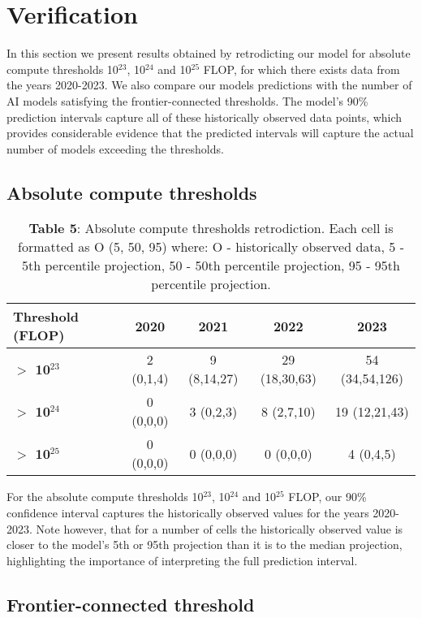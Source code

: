 \documentclass[11pt]{article}
\begin{document}
\section{Verification}

In this section we present results obtained by retrodicting our model for absolute compute thresholds 10$^{23}$, 10$^{24}$ and 10$^{25}$ FLOP, for which there exists data from the years 2020-2023. We also compare our models predictions with the number of AI models satisfying the frontier-connected thresholds. The model's 90\% prediction intervals capture all of these historically observed data points, which provides considerable evidence that the predicted intervals will capture the actual number of models exceeding the thresholds.

\subsection{Absolute compute thresholds}

\begin{table}[h]
\centering
\caption*{\textbf{Table 5}: Absolute compute thresholds retrodiction. Each cell is formatted as O (5, 50, 95) where: O - historically observed data, 5 - 5th percentile projection, 50 - 50th percentile projection, 95 - 95th percentile projection.}
\label{tab:absolute-retrodiction}
\begin{tabular}{|l|c|c|c|c|}
\hline
\textbf{Threshold (FLOP)} & \textbf{2020} & \textbf{2021} & \textbf{2022} & \textbf{2023} \\
\hline
\textbf{$>$ 10$^{23}$} & 2 (0,1,4) & 9 (8,14,27) & 29 (18,30,63) & 54 (34,54,126) \\
\hline
\textbf{$>$ 10$^{24}$} & 0 (0,0,0) & 3 (0,2,3) & 8 (2,7,10) & 19 (12,21,43) \\
\hline
\textbf{$>$ 10$^{25}$} & 0 (0,0,0) & 0 (0,0,0) & 0 (0,0,0) & 4 (0,4,5) \\
\hline
\end{tabular}
\end{table}

For the absolute compute thresholds 10$^{23}$, 10$^{24}$ and 10$^{25}$ FLOP, our 90\% confidence interval captures the historically observed values for the years 2020-2023. Note however, that for a number of cells the historically observed value is closer to the model's 5th or 95th projection than it is to the median projection, highlighting the importance of interpreting the full prediction interval.

\subsection{Frontier-connected threshold}
\end{document}
